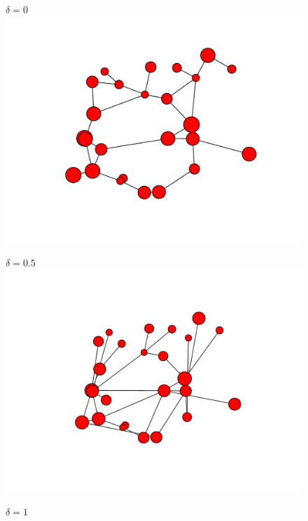 \documentclass{scrartcl}
\begin{document}
\begin{figure}[htbp]
\centering
\begin{minipage}[b]{.45\linewidth}
	\centering
	$\delta = 0$
	\includegraphics[width=\textwidth]{pictures/d0.pdf}
	\end{minipage}
	\nolinebreak 
	\begin{minipage}[b]{.45\linewidth}
	\centering
	$\delta = 0.5$
	\includegraphics[width=\textwidth]{pictures/d5.pdf}
  \end{minipage}
	\begin{minipage}[b]{.45\linewidth}
	\centering
	$\delta = 1$

\end{minipage}
\end{figure}
\end{document}
